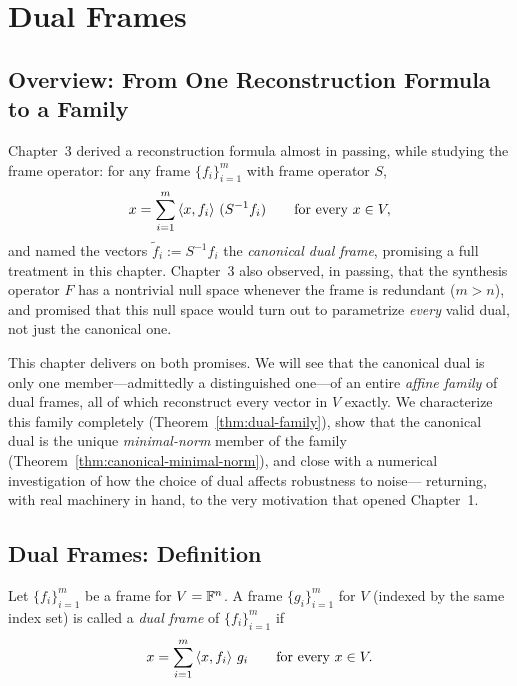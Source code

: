 \chapter{Dual Frames}
\label{ch:dual-frames}
\section{Overview: From One Reconstruction Formula to a Family}
\label{sec:ch5-overview}

Chapter~3 derived a reconstruction formula almost in passing, while
studying the frame operator: for any frame $\{f_i\}_{i=1}^m$ with frame
operator $S$,
\[
  x = \sum_{i=1}^m \left\langle x, f_i \right\rangle\,(S^{-1}f_i) \qquad \text{for every } x \in V,
\]
and named the vectors $\tilde f_i := S^{-1}f_i$ the \emph{canonical dual
frame}, promising a full treatment in this chapter. Chapter~3 also
observed, in passing, that the synthesis operator $F$ has a nontrivial
null space whenever the frame is redundant ($m>n$), and promised that
this null space would turn out to parametrize \emph{every} valid dual,
not just the canonical one.

This chapter delivers on both promises. We will see that the canonical
dual is only one member---admittedly a distinguished one---of an entire
\emph{affine family} of dual frames, all of which reconstruct every
vector in $V$ exactly. We characterize this family completely
(Theorem~\ref{thm:dual-family}), show that the canonical dual is the
unique \emph{minimal-norm} member of the family
(Theorem~\ref{thm:canonical-minimal-norm}), and close with a numerical
investigation of how the choice of dual affects robustness to noise---
returning, with real machinery in hand, to the very motivation that
opened Chapter~1.

\section{Dual Frames: Definition}
\label{sec:dual-definition}

\begin{definition}
\label{def:dual-frame}
Let $\{f_i\}_{i=1}^m$ be a frame for $V=\mathbb{F}^n$. A frame $\{g_i\}_{i=1}^m$
for $V$ (indexed by the same index set) is called a \emph{dual frame} of
$\{f_i\}_{i=1}^m$ if
\begin{equation}
\label{eq:dual-condition}
  x = \sum_{i=1}^m \left\langle x, f_i \right\rangle\, g_i \qquad \text{for every } x \in V.
\end{equation}
\end{definition}

